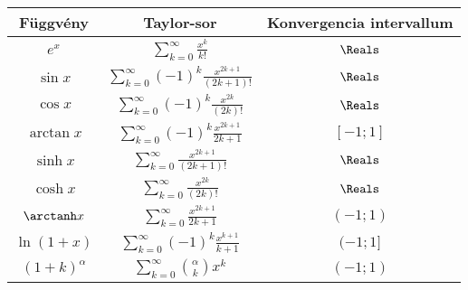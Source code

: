 \documentclass[a4paper, 12pt]{scrartcl}
\begin{document}
\begin{blueBox}
  \vspace{-3mm}
  \begin{center}
    \setlength\extrarowheight{5pt}
    \renewcommand{\arraystretch}{1.4}
    \begin{tabular}{|c|c|c|}
      \hline
      Függvény         & Taylor-sor                                                         & Konvergencia intervallum
      \\[10pt]
      \hline
      $e^x$            & $\displaystyle\sum_{k=0}^{\infty} \frac{x^k}{k!}$                  & $\Reals$
      \\[10pt]
      \hline
      $\sin x$         & $\displaystyle\sum_{k=0}^{\infty} (-1)^k \frac{x^{2k+1}}{(2k+1)!}$ & $\Reals$
      \\[10pt]
      \hline
      $\cos x$         & $\displaystyle\sum_{k=0}^{\infty} (-1)^k \frac{x^{2k}}{(2k)!}$     & $\Reals$
      \\[10pt]
      \hline
      $\arctan x$      & $\displaystyle\sum_{k=0}^{\infty} (-1)^k \frac{x^{2k+1}}{2k+1}$    & $[-1; 1]$
      \\[10pt]
      \hline
      $\sinh x$        & $\displaystyle\sum_{k=0}^{\infty} \frac{x^{2k+1}}{(2k+1)!}$        & $\Reals$
      \\[10pt]
      \hline
      $\cosh x$        & $\displaystyle\sum_{k=0}^{\infty} \frac{x^{2k}}{(2k)!}$            & $\Reals$
      \\[10pt]
      \hline
      $\arctanh x$     & $\displaystyle\sum_{k=0}^{\infty} \frac{x^{2k+1}}{2k+1}$           & $(-1; 1)$
      \\[10pt]
      \hline
      $\ln(1 + x)$     & $\displaystyle\sum_{k=0}^{\infty} (-1)^{k} \frac{x^{k+1}}{k+1}$    & $(-1; 1]$
      \\[10pt]
      \hline
      $(1 + k)^\alpha$ & $\displaystyle\sum_{k=0}^{\infty} \binom{\alpha}{k} x^k$           & $(-1; 1)$
      \\[10pt]
      \hline
    \end{tabular}
  \end{center}
\end{blueBox}
\end{document}
